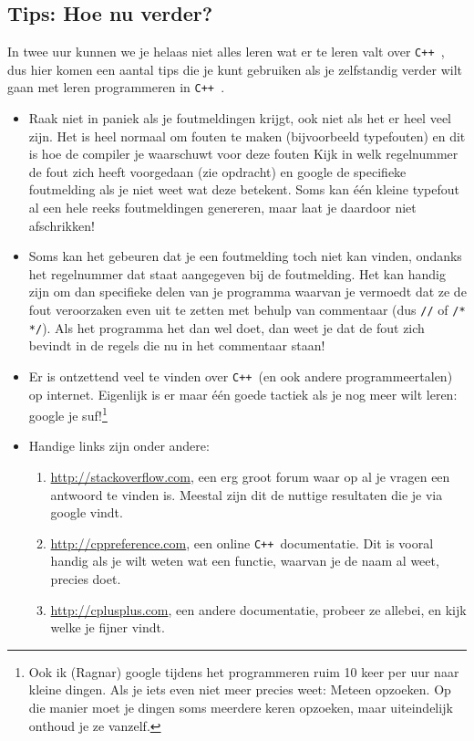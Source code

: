 \documentclass[12pt,a4paper]{article}
\newcommand{\icode}{\lstinline}
\newcommand{\mono}{\texttt}
\newcommand{\cpp}{\mono{C++ }}
\begin{document}
\subsection{Tips: Hoe nu verder?}
In twee uur kunnen we je helaas niet alles leren wat er te leren valt over \cpp, dus hier komen een aantal tips die je kunt gebruiken als je zelfstandig verder wilt gaan met leren programmeren in \cpp. 
\begin{itemize}
	\item Raak niet in paniek als je foutmeldingen krijgt, ook niet als het er heel veel zijn. Het is heel normaal om fouten te maken (bijvoorbeeld typefouten) en dit is hoe de compiler je waarschuwt voor deze fouten Kijk in welk regelnummer de fout zich heeft voorgedaan (zie opdracht) en google de specifieke foutmelding als je niet weet wat deze betekent. Soms kan \'e\'en kleine typefout al een hele reeks foutmeldingen genereren, maar laat je daardoor niet afschrikken! 
	\item Soms kan het gebeuren dat je een foutmelding toch niet kan vinden, ondanks het regelnummer dat staat aangegeven bij de foutmelding. Het kan handig zijn om dan specifieke delen van je programma waarvan je vermoedt dat ze de fout veroorzaken even uit te zetten met behulp van commentaar (dus \icode{//} of \icode{/* */}). Als het programma het dan wel doet, dan weet je dat de fout zich bevindt in de regels die nu in het commentaar staan! 
	\item Er is ontzettend veel te vinden over \cpp (en ook andere programmeertalen) op internet. Eigenlijk is er maar \'e\'en goede tactiek als je nog meer wilt leren: google je suf!\footnote{
			Ook ik (Ragnar) google tijdens het programmeren ruim 10 keer per uur naar kleine dingen. Als je iets even niet meer precies weet: Meteen opzoeken. Op die manier moet je dingen soms meerdere keren opzoeken, maar uiteindelijk onthoud je ze vanzelf.
		}
	\item Handige links zijn onder andere:
		\begin{enumerate}
				\item
					\url{http://stackoverflow.com}, een erg groot forum waar op al je vragen een antwoord te vinden is.
					Meestal zijn dit de nuttige resultaten die je via google vindt.
				\item
					\url{http://cppreference.com}, een online \cpp documentatie. Dit is vooral handig als je wilt weten wat een functie, waarvan je de naam al weet, precies doet.
				\item 
					\url{http://cplusplus.com}, een andere documentatie, probeer ze allebei, en kijk welke je fijner vindt.

\end{enumerate}
\end{itemize}
\end{document}
